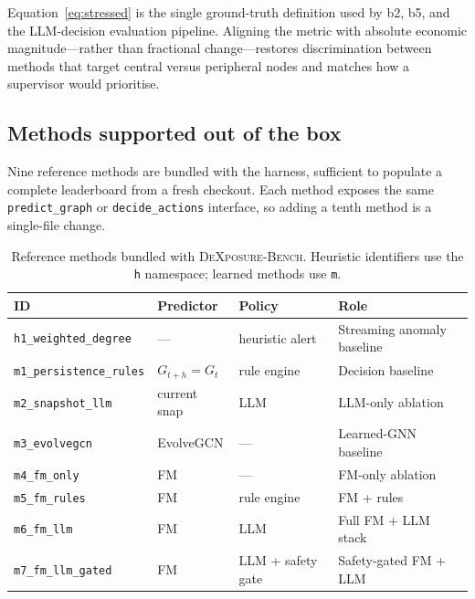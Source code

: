 Equation~\ref{eq:stressed} is the single ground-truth definition used
by b2, b5, and the LLM-decision evaluation pipeline.  Aligning the
metric with absolute economic magnitude---rather than fractional
change---restores discrimination between methods that target central
versus peripheral nodes and matches how a supervisor would
prioritise.

\subsection{Methods supported out of the box}

Nine reference methods are bundled with the harness, sufficient to
populate a complete leaderboard from a fresh checkout.  Each method
exposes the same \texttt{predict\_graph} or
\texttt{decide\_actions} interface, so adding a tenth method is a
single-file change.

\begin{table}[t]
\centering
\caption{Reference methods bundled with \textsc{DeXposure-Bench}.
Heuristic identifiers use the \texttt{h} namespace; learned methods
use \texttt{m}.}
\label{tab:bench-methods}
\footnotesize
\setlength{\tabcolsep}{4pt}
\begin{tabularx}{\linewidth}{@{}lllX@{}}
\toprule
ID & Predictor & Policy & Role \\
\midrule
\texttt{h1\_weighted\_degree}   & ---            & heuristic alert  & Streaming anomaly baseline \\
\texttt{m1\_persistence\_rules} & $G_{t+h}=G_t$  & rule engine      & Decision baseline \\
\texttt{m2\_snapshot\_llm}      & current snap   & LLM              & LLM-only ablation \\
\texttt{m3\_evolvegcn}          & EvolveGCN      & ---              & Learned-GNN baseline \\
\texttt{m4\_fm\_only}           & FM             & ---              & FM-only ablation \\
\texttt{m5\_fm\_rules}          & FM             & rule engine      & FM + rules \\
\texttt{m6\_fm\_llm}            & FM             & LLM              & Full FM + LLM stack \\
\texttt{m7\_fm\_llm\_gated}     & FM             & LLM + safety gate & Safety-gated FM + LLM \\
\bottomrule
\end{tabularx}
\end{table}

